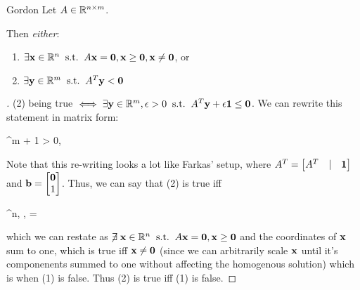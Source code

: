 \begin{theo}{Gordon}{}
Let $A \in \mathbb{R}^{n \times m}$. 

\medskip
Then \textit{either}:
\begin{enumerate}[(1)]
	\item $\exists \mathbf{x} \in \mathbb{R}^n \;\; \text{s.t.} \;\; A\mathbf{x}=\mathbf{0}, \mathbf{x} \geq \mathbf{0}, 
		\mathbf{x} \neq \mathbf{0}$, or
	\item $\exists \mathbf{y} \in \mathbb{R}^m \;\; \text{s.t.} \;\; A^T\mathbf{y} < \mathbf{0}$
\end{enumerate}
\end{theo}

\begin{proof}[]

(2) being true $\iff \exists \mathbf{y} \in \mathbb{R}^m, \epsilon > 0 \;\; \text{s.t.} \;\; A^T\mathbf{y} + \epsilon
\mathbf{1} \leq \mathbf{0}$.
We can rewrite this statement in matrix form:
\begin{frml}
	\exists \mat{\vy \\ \epsilon} \in \reals^{m + 1} \st {}
	\mat{\vy \\ \epsilon} > 0, \mat{\vy \\ \epsilon}
	\leq \vzero
\end{frml}
Note that this re-writing looks a lot like Farkas' setup, where $A^T = \begin{bmatrix} A^T & | & \mathbf{1} \end{bmatrix}$
and $\mathbf{b} = \begin{bmatrix} \mathbf{0} \\ 1 \end{bmatrix}$. Thus, we can
say that (2) is true iff
\begin{frml}
	\centernot \exists \vx \in \reals^n,\; \vx \geq \vzero,\; \st {}\vx = 
\end{frml}
which we can restate as $\centernot \exists \vx \in \reals^n \st \vA\vx=\vzero,
\vx \geq \vzero$ and the coordinates of $\mathbf{x}$ sum to one, which is true iff
$\mathbf{x} \neq \mathbf{0}$ 
(since we can arbitrarily scale $\mathbf{x}$
until it's componenents summed to one without affecting the homogenous solution)
which is when (1) is false. Thus (2) is true iff (1) is false.
	
\end{proof}
